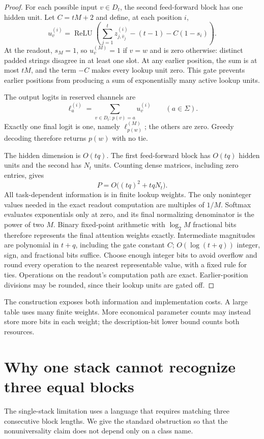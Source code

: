 \documentclass[11pt,twoside]{article}
\theoremstyle{definition}
\theoremstyle{remark}
\begin{document}
\begin{proof}
For each possible input $v\in D_t$, the second feed-forward block has one
hidden unit. Let $C=tM+2$ and define, at each position $i$,
\[
 u_v^{(i)}=\operatorname{ReLU}\left(
   \sum_{j=1}^{t}z_{j,\bar v_j}^{(i)}-(t-1)-C(1-s_i)\right).
\]
At the readout, $s_M=1$, so $u_v^{(M)}=1$ if $v=w$ and is zero otherwise:
distinct padded strings disagree in at least one slot. At any earlier
position, the sum is at most $tM$, and the term $-C$ makes every lookup
unit zero. This gate prevents earlier positions from producing a sum of
exponentially many active lookup units.

The output logits in reserved channels are
\[
 \ell_a^{(i)}=\sum_{v\in D_t:\,p(v)=a}u_v^{(i)}\qquad(a\in\Sigma).
\]
Exactly one final logit is one, namely $\ell_{p(w)}^{(M)}$; the others are
zero. Greedy decoding therefore returns $p(w)$ with no tie.

The hidden dimension is $O(tq)$. The first feed-forward block has
$O(tq)$ hidden units and the second has $N_t$ units. Counting dense
matrices, including zero entries, gives
\[
 P=O\bigl((tq)^2+tqN_t\bigr).
\]
All task-dependent information is in finite lookup weights. The only
noninteger values needed in the exact readout computation are multiples
of $1/M$. Softmax evaluates exponentials only at zero, and its final
normalizing denominator is the power of two $M$. Binary fixed-point
arithmetic with $\log_2 M$ fractional bits therefore represents the final
attention weights exactly. Intermediate magnitudes are polynomial in
$t+q$, including the gate constant $C$; $O(\log(t+q))$ integer, sign,
and fractional bits suffice. Choose enough integer bits to avoid overflow
and round every operation to the nearest representable value, with a fixed
rule for ties. Operations on the readout's computation path are exact.
Earlier-position divisions may be rounded, since their lookup units are
gated off.
\end{proof}

The construction exposes both information and implementation costs. A
large table uses many finite weights. More economical parameter counts
may instead store more bits in each weight; the description-bit lower
bound counts both resources.

\section{Why one stack cannot recognize three equal blocks}
\label{app:pumping}

The single-stack limitation uses a language that requires matching three
consecutive block lengths. We give the standard obstruction so that the
nonuniversality claim does not depend only on a class name.
\end{document}
